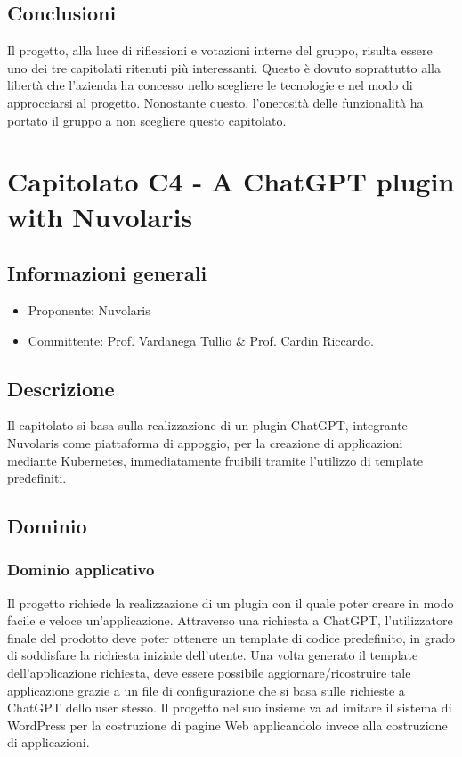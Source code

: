 \documentclass[12pt]{report}
\begin{document}
\section{Conclusioni}
Il progetto, alla luce di riflessioni e votazioni interne del gruppo, risulta essere uno dei tre capitolati ritenuti più interessanti. Questo è dovuto soprattutto alla libertà che l'azienda ha concesso nello scegliere le tecnologie e nel modo di approcciarsi al progetto. Nonostante questo, l'onerosità delle funzionalità ha portato il gruppo a non scegliere questo capitolato.



\chapter{Capitolato C4 - A ChatGPT plugin with Nuvolaris}\label{chapter:4}
\section{Informazioni generali}
\begin{itemize}
    \item Proponente: Nuvolaris
    \item Committente: Prof. Vardanega Tullio \& Prof. Cardin Riccardo.
\end{itemize}

\section{Descrizione}
Il capitolato si basa sulla realizzazione di un plugin ChatGPT, integrante Nuvolaris come piattaforma di appoggio, per la creazione di applicazioni mediante Kubernetes, immediatamente fruibili tramite l'utilizzo di template predefiniti.

\section{Dominio}
\subsection{Dominio applicativo}
Il progetto richiede la realizzazione di un plugin con il quale poter creare in modo facile e veloce un'applicazione. Attraverso una richiesta a ChatGPT, l'utilizzatore finale del prodotto deve poter ottenere un template di codice predefinito, in grado di soddisfare la richiesta iniziale dell'utente. Una volta generato il template dell'applicazione richiesta, deve essere possibile aggiornare/ricostruire tale applicazione grazie a un file di configurazione che si basa sulle richieste a ChatGPT dello user stesso. Il progetto nel suo insieme va ad imitare il sistema di WordPress per la costruzione di pagine Web applicandolo invece alla costruzione di applicazioni.
\end{document}
